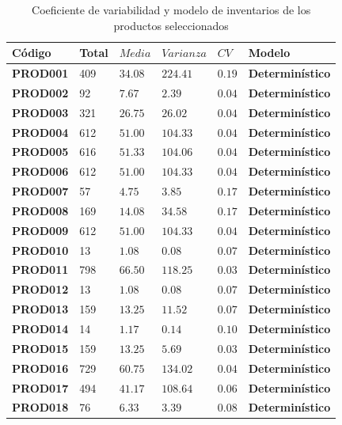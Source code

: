 \begin{table}[H]
    \caption{Coeficiente de variabilidad y modelo de inventarios de los productos seleccionados}
    \begin{tabular}{p{2cm} p{2cm} p{2cm} p{2cm} p{2cm} p{2.5cm}} %
        \hline
        \textbf{Código} & \textbf{Total} & \textbf{$Media$} & \textbf{$Varianza$} & \textbf{$CV$} & \textbf{Modelo} \\
        \hline
        \textbf{PROD001} & 409 & $34.08$ & $224.41$ & $0.19$ & \textbf{Determinístico} \\
        \textbf{PROD002} & 92 & $7.67$ & $2.39$ & $0.04$ & \textbf{Determinístico} \\
        \textbf{PROD003} & 321 & $26.75$ & $26.02$ & $0.04$ & \textbf{Determinístico} \\
        \textbf{PROD004} & 612 & $51.00$ & $104.33$ & $0.04$ & \textbf{Determinístico} \\
        \textbf{PROD005} & 616 & $51.33$ & $104.06$ & $0.04$ & \textbf{Determinístico} \\
        \textbf{PROD006} & 612 & $51.00$ & $104.33$ & $0.04$ & \textbf{Determinístico} \\
        \textbf{PROD007} & 57 & $4.75$ & $3.85$ & $0.17$ & \textbf{Determinístico} \\
        \textbf{PROD008} & 169 & $14.08$ & $34.58$ & $0.17$ & \textbf{Determinístico} \\
        \textbf{PROD009} & 612 & $51.00$ & $104.33$ & $0.04$ & \textbf{Determinístico} \\
        \textbf{PROD010} & 13 & $1.08$ & $0.08$ & $0.07$ & \textbf{Determinístico} \\
        \textbf{PROD011} & 798 & $66.50$ & $118.25$ & $0.03$ & \textbf{Determinístico} \\
        \textbf{PROD012} & 13 & $1.08$ & $0.08$ & $0.07$ & \textbf{Determinístico} \\
        \textbf{PROD013} & 159 & $13.25$ & $11.52$ & $0.07$ & \textbf{Determinístico} \\
        \textbf{PROD014} & 14 & $1.17$ & $0.14$ & $0.10$ & \textbf{Determinístico} \\
        \textbf{PROD015} & 159 & $13.25$ & $5.69$ & $0.03$ & \textbf{Determinístico} \\
        \textbf{PROD016} & 729 & $60.75$ & $134.02$ & $0.04$ & \textbf{Determinístico} \\
        \textbf{PROD017} & 494 & $41.17$ & $108.64$ & $0.06$ & \textbf{Determinístico} \\
        \textbf{PROD018} & 76 & $6.33$ & $3.39$ & $0.08$ & \textbf{Determinístico} \\
        \hline
    \end{tabular}
    \label{table:GrupoA_Area}
\end{table}

